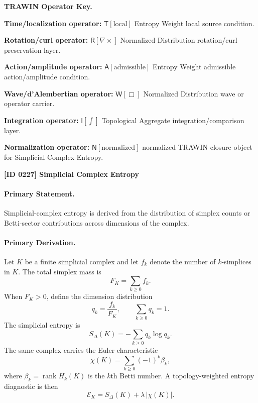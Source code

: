 \par\vspace{0.45\baselineskip}
\noindent\begin{minipage}[t]{\linewidth}
\begingroup
\small
\raggedright
\textbf{TRAWIN Operator Key.}\par
\noindent\textbf{Time/localization operator:} $\mathsf{T}\!\left[\mathrm{local}\right]$ Entropy Weight local source condition.\par
\noindent\textbf{Rotation/curl operator:} $\mathsf{R}\!\left[\nabla\times\right]$ Normalized Distribution rotation/curl preservation layer.\par
\noindent\textbf{Action/amplitude operator:} $\mathsf{A}\!\left[\mathrm{admissible}\right]$ Entropy Weight admissible action/amplitude condition.\par
\noindent\textbf{Wave/d'Alembertian operator:} $\mathsf{W}\!\left[\Box\right]$ Normalized Distribution wave or operator carrier.\par
\noindent\textbf{Integration operator:} $\mathsf{I}\!\left[\int\right]$ Topological Aggregate integration/comparison layer.\par
\noindent\textbf{Normalization operator:} $\mathsf{N}\!\left[\mathrm{normalized}\right]$ normalized TRAWIN closure object for Simplicial Complex Entropy.\par
\endgroup
\end{minipage}

\clearpage
\noindent\textbf{[ID 0227] Simplicial Complex Entropy}\par
\vspace{0.35em}
\paragraph{Primary Statement.}

Simplicial-complex entropy is derived from the distribution of simplex counts or Betti-sector contributions across dimensions of the complex.

\paragraph{Primary Derivation.}

Let \(K\) be a finite simplicial complex and let \(f_k\) denote the number of \(k\)-simplices in \(K\). The total simplex mass is
\[
F_K=\sum_{k\ge 0} f_k.
\]
When \(F_K>0\), define the dimension distribution
\[
q_k=\frac{f_k}{F_K},\qquad \sum_{k\ge 0}q_k=1.
\]
The simplicial entropy is
\[
S_{\Delta}(K)=-\sum_{k\ge 0}q_k\log q_k.
\]
The same complex carries the Euler characteristic
\[
\chi(K)=\sum_{k\ge 0}(-1)^k\beta_k,
\]
where \(\beta_k=\operatorname{rank}H_k(K)\) is the \(k\)th Betti number. A topology-weighted entropy diagnostic is then
\[
\mathcal{E}_{K}=S_{\Delta}(K)+\lambda\,|\chi(K)|.
\]

